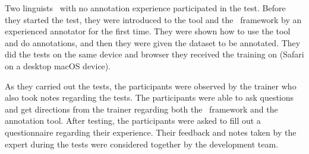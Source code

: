 Two linguists~\cite{anon} with no annotation experience participated in the test.
Before they started the test, they were introduced to the tool and the \ud\ framework by an experienced annotator for the first time.
They were shown how to use the tool and do annotations, and then they were given the dataset to be annotated.
They did the tests on the same device and browser they received the training on (Safari on a desktop macOS device).

As they carried out the tests, the participants were observed by the trainer who also took notes regarding the tests.
The participants were able to ask questions and get directions from the trainer regarding both the \ud\ framework and the annotation tool.
After testing, the participants were asked to fill out a questionnaire regarding their experience.
Their feedback and notes taken by the expert during the tests were considered together by the development team.